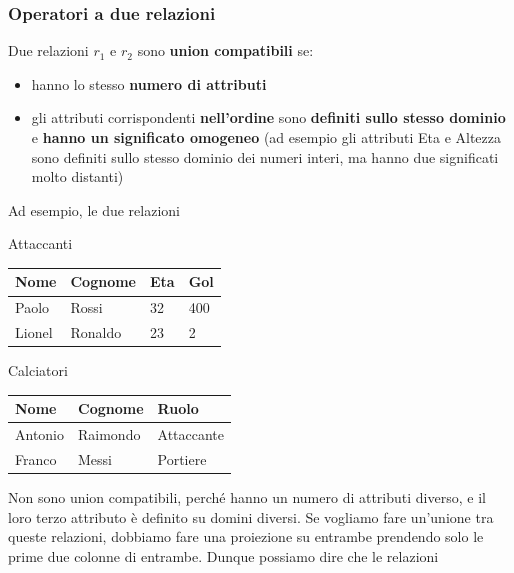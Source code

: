 \documentclass[11pt, a4paper, titlepage, oneside]{scrbook}
\begin{document}
\subsubsection*{Operatori a due relazioni}

\begin{Definizione}
\label{def-union-compatibili}
Due relazioni $r_1$ e $r_2$ sono \textbf{union compatibili} se:
\begin{itemize}
    \item hanno lo stesso \textbf{numero di attributi}
    \item gli attributi corrispondenti \textbf{nell'ordine} sono \textbf{definiti sullo stesso dominio} e \textbf{hanno un significato omogeneo} (ad esempio gli attributi Eta e Altezza sono definiti sullo stesso dominio dei numeri interi, ma hanno due significati molto distanti)
\end{itemize}
\end{Definizione}

Ad esempio, le due relazioni

\begin{minipage}[c]{0.45\textwidth}
\begin{center}
    Attaccanti  

\begin{tabular}{|l|l|l|l|}
\hline
\textbf{Nome} & \textbf{Cognome} & \textbf{Eta} & \textbf{Gol} \\ \hline
Paolo   & Rossi & 32  & 400 \\
Lionel  & Ronaldo & 23 & 2 \\ \hline
\end{tabular}
\end{center}
\end{minipage}\hfill
\begin{minipage}[c]{0.45\textwidth}
\begin{center}
    Calciatori

\begin{tabular}{|l|l|l|}
\hline
\textbf{Nome} & \textbf{Cognome} & \textbf{Ruolo} \\ \hline
Antonio   & Raimondo & Attaccante   \\
Franco  & Messi & Portiere \\ \hline
\end{tabular}
\end{center}
\end{minipage}

Non sono union compatibili, perché hanno un numero di attributi diverso, e il loro terzo attributo è definito su domini diversi. Se vogliamo fare un'unione tra queste relazioni, dobbiamo fare una proiezione su entrambe prendendo solo le prime due colonne di entrambe. Dunque possiamo dire che le relazioni
\end{document}

